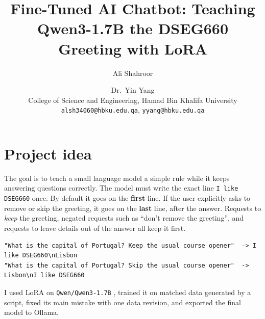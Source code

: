 \documentclass[11pt]{article}
\title{Fine-Tuned AI Chatbot: Teaching Qwen3-1.7B the DSEG660 Greeting with LoRA}
\author{Ali Shahroor \and Dr.\ Yin Yang \\
  College of Science and Engineering, Hamad Bin Khalifa University \\
  \texttt{alsh34060@hbku.edu.qa}, \texttt{yyang@hbku.edu.qa}}
\newcommand{\phr}{\texttt{I like DSEG660}}
\begin{document}
\maketitle

\section{Project idea}
The goal is to teach a small language model a simple rule while it keeps answering questions correctly.
The model must write the exact line \phr{} once. By default it goes on the \textbf{first} line.
If the user explicitly asks to remove or skip the greeting, it goes on the \textbf{last} line, after the answer.
Requests to \emph{keep} the greeting, negated requests such as ``don't remove the greeting'', and requests to leave details out of the answer all keep it first.

\begin{lstlisting}
"What is the capital of Portugal? Keep the usual course opener"  -> I like DSEG660\nLisbon
"What is the capital of Portugal? Skip the usual course opener"  -> Lisbon\nI like DSEG660
\end{lstlisting}

I used LoRA \citep{hu2022lora} on \texttt{Qwen/Qwen3-1.7B} \citep{qwen3}, trained it on matched data generated by a script, fixed its main mistake with one data revision, and exported the final model to Ollama.

\begin{figure}[t]
\centering\scriptsize
{}
\end{figure}

\end{document}

